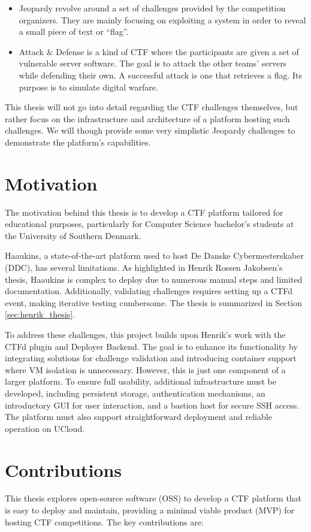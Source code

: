 \begin{itemize}
    \item Jeopardy revolve around a set of challenges provided by the competition organizers. They are mainly focusing on exploiting a system in order to reveal a small piece of text or ``flag''. 
    \item Attack \& Defense is a kind of CTF where the participants are given a set of vulnerable server software. The goal is to attack the other teams' servers while defending their own. A successful attack is one that retrieves a flag. Its purpose is to simulate digital warfare.
\end{itemize}

This thesis will not go into detail regarding the CTF challenges themselves, but rather focus on the infrastructure and architecture of a platform hosting such challenges. We will though provide some very simplistic Jeopardy challenges to demonstrate the platform's capabilities.

\section{Motivation}
The motivation behind this thesis is to develop a CTF platform tailored for educational purposes, particularly for Computer Science bachelor's students at the University of Southern Denmark.

Haaukins, a state-of-the-art platform used to host De Danske Cybermesterskaber (DDC), has several limitations. As highlighted in Henrik Rossen Jakobsen's thesis, Haaukins is complex to deploy due to numerous manual steps and limited documentation. Additionally, validating challenges requires setting up a CTFd event, making iterative testing cumbersome. The thesis is summarized in Section \ref{sec:henrik_thesis}.

To address these challenges, this project builds upon Henrik's work with the CTFd plugin and Deployer Backend. The goal is to enhance its functionality by integrating solutions for challenge validation and introducing container support where VM isolation is unnecessary. However, this is just one component of a larger platform. To ensure full usability, additional infrastructure must be developed, including persistent storage, authentication mechanisms, an introductory GUI for user interaction, and a bastion host for secure SSH access. The platform must also support straightforward deployment and reliable operation on UCloud.

\section{Contributions}
This thesis explores open-source software (OSS) to develop a CTF platform that is easy to deploy and maintain, providing a minimal viable product (MVP) for hosting CTF competitions. The key contributions are:

